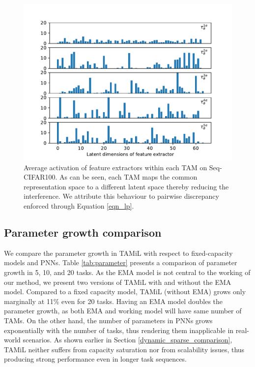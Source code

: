 \documentclass{article} %
\begin{document}
\begin{figure}[t]
  \centering
  \includegraphics[width=0.95\linewidth]{images/selector_out.pdf}
  \caption{Average activation of feature extractors within each TAM on Seq-CIFAR100. As can be seen, each TAM maps the common representation space to a different latent space thereby reducing the interference. We attribute this behaviour to pairwise discrepancy enforced through Equation \ref{eqn_lp}.}
  \label{fig:selector_out}
\end{figure}


\subsection{Parameter growth comparison}

We compare the parameter growth in TAMiL with respect to fixed-capacity models and PNNs. Table \ref{tab:parameter} presents a comparison of parameter growth in 5, 10, and 20 tasks. As the EMA model is not central to the working of our method, we present two versions of TAMiL with and without the EMA model.  Compared to a fixed capacity model, TAMiL (without EMA) grows only marginally at 11\% even for 20 tasks.  Having an EMA model doubles the parameter growth, as both EMA and working model will have same number of TAMs. On the other hand, the number of parameters in PNNs grows exponentially with the number of tasks, thus rendering them inapplicable in real-world scenarios. As shown earlier in Section \ref{dynamic_sparse_comparison}, TAMiL neither suffers from capacity saturation nor from scalability issues, thus producing strong performance even in longer task sequences. 
\end{document}
